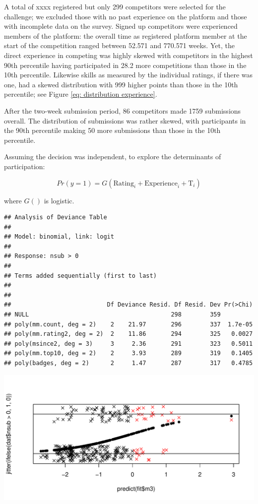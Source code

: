 \documentclass[12pt,]{article}
\begin{document}
A total of xxxx registered but only 299 competitors were selected for
the challenge; we excluded those with no past experience on the platform
and those with incomplete data on the survey. Signed up competitors were
experienced members of the platform: the overall time as registered
platform member at the start of the competition ranged between 52.571
and 770.571 weeks. Yet, the direct experience in competing was highly
skewed with competitors in the highest 90th percentile having
participated in 28.2 more competitions than those in the 10th
percentile. Likewise skills as measured by the individual ratings, if
there was one, had a skewed distribution with 999 higher points than
those in the 10th percentile; see Figure
\ref{eq: distribution experience}.

After the two-week submission period, 86 competitors made 1759
submissions overall. The distribution of submissions was rather skewed,
with participants in the 90th percentile making 50 more submissions than
those in the 10th percentile.

Assuming the decision was independent, to explore the determinants of
participation:

\begin{equation}
  Pr(y=1) = G(\text{Rating}_{i} + \text{Experience}_{i} + \text{T}_{i})
\end{equation}

where \(G()\) is logistic.

\begin{verbatim}
## Analysis of Deviance Table
## 
## Model: binomial, link: logit
## 
## Response: nsub > 0
## 
## Terms added sequentially (first to last)
## 
## 
##                           Df Deviance Resid. Df Resid. Dev Pr(>Chi)
## NULL                                        298        359         
## poly(mm.count, deg = 2)    2    21.97       296        337  1.7e-05
## poly(mm.rating2, deg = 2)  2    11.86       294        325   0.0027
## poly(msince2, deg = 3)     3     2.36       291        323   0.5011
## poly(mm.top10, deg = 2)    2     3.93       289        319   0.1405
## poly(badges, deg = 2)      2     1.47       287        317   0.4785
\end{verbatim}

\includegraphics{Figures/unnamed-chunk-8-1.pdf}
\end{document}
